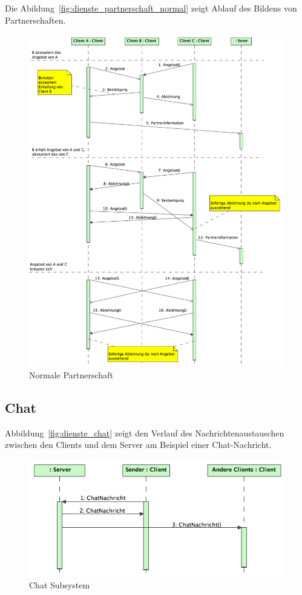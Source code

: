 \documentclass[12pt,halfparskip]{scrartcl}
\begin{document}
Die Abildung~\vref{fig:dienste_partnerschaft_normal} zeigt Ablauf des Bildens von Partnerschaften.
\begin{figure}[h]
	\centering
	\includegraphics[width=\textwidth]{dienste_partnerschaft_normal}
	\caption{Normale Partnerschaft}
	\label{fig:dienste_partnerschaft_normal}
\end{figure}

\subsection{Chat} %
\label{sub:nachrichtenaustausch_zwischen_client_und_server}
Abbildung~\vref{fig:dienste_chat} zeigt den Verlauf des Nachrichtenaustauschen zwischen den Clients und dem Server am Beispiel einer Chat-Nachricht.
\begin{figure}[h]
	\centering
	\includegraphics[width=\textwidth]{dienste_chat}
	\caption{Chat Subsystem}
	\label{fig:dienste_chat}
\end{figure}
\clearpage
\end{document}
